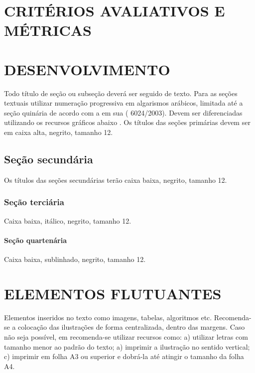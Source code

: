\chapter{CRITÉRIOS AVALIATIVOS E MÉTRICAS}
\chapter{DESENVOLVIMENTO}

Todo título de seção ou subseção deverá ser seguido de texto.
Para as seções textuais utilizar numeração progressiva em algarismos arábicos, limitada até a seção quinária de acordo com 
a  em sua ( 6024/2003). Devem ser diferenciadas utilizando os recursos gráficos abaixo \cite{manualpuc}.
Os títulos das seções primárias devem ser em caixa alta, negrito, tamanho 12.

\section{\esp Seção secundária}

Os títulos das seções secundárias terão caixa baixa, negrito, tamanho 12.

\subsection{\esp Seção terciária}

Caixa baixa, itálico, negrito, tamanho 12.

\subsubsection{\esp Seção quartenária}
 
 Caixa baixa, sublinhado, negrito, tamanho 12.
 
 

\chapter{ELEMENTOS FLUTUANTES}

Elementos inseridos no texto como imagens, tabelas, algoritmos etc.
Recomenda-se a colocação das ilustrações de forma centralizada, dentro das margens. 
Caso não seja possível, em  recomenda-se utilizar recursos como: 
 a) utilizar letras com tamanho menor ao padrão do texto; a) imprimir a ilustração no sentido vertical; 
 c) imprimir em folha A3 ou superior e dobrá-la até atingir o tamanho da folha A4. 

